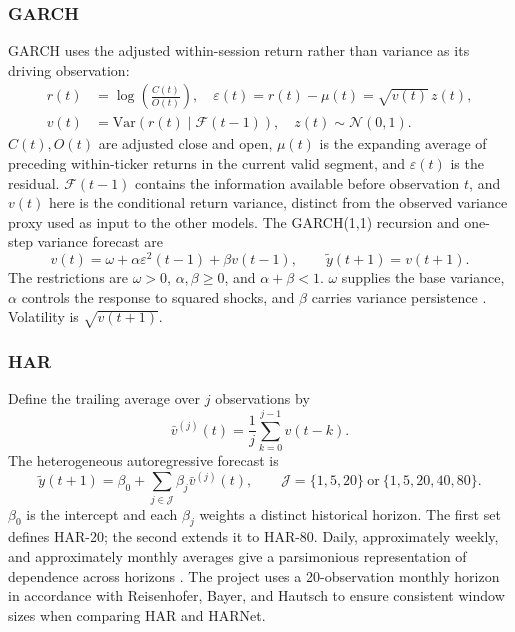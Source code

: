 \documentclass[12pt,a4paper]{article}
\numberwithin{equation}{section}
\numberwithin{table}{section}
\numberwithin{figure}{section}
\begin{document}
\subsubsection{GARCH}
GARCH uses the adjusted within-session return rather than variance as its driving observation:
\begin{equation}\label{eq:methods-garch-return}
\begin{aligned}
r(t)&=\log\!\left(\frac{C(t)}{O(t)}\right),\quad
\varepsilon(t)=r(t)-\mu(t)=\sqrt{v(t)}\,z(t),\\
v(t)&=\mathrm{Var}\!\left(r(t)\mid\mathcal F(t-1)\right),\quad z(t)\sim\mathcal N(0,1).
\end{aligned}
\end{equation}
$C(t),O(t)$ are adjusted close and open, $\mu(t)$ is the expanding average of preceding within-ticker returns in the current valid segment, and $\varepsilon(t)$ is the residual. $\mathcal F(t-1)$ contains the information available before observation $t$, and $v(t)$ here is the conditional return variance, distinct from the observed variance proxy used as input to the other models. The GARCH(1,1) recursion and one-step variance forecast are
\begin{equation}\label{eq:methods-garch}
v(t)=\omega+\alpha\varepsilon^2(t-1)+\beta v(t-1),\qquad
\widetilde y(t+1)=v(t+1).
\end{equation}
The restrictions are $\omega>0$, $\alpha,\beta\geq0$, and $\alpha+\beta<1$. $\omega$ supplies the base variance, $\alpha$ controls the response to squared shocks, and $\beta$ carries variance persistence \cite{bollerslev1986}. Volatility is $\sqrt{v(t+1)}$.

\subsubsection{HAR}
Define the trailing average over $j$ observations by
\begin{equation}\label{eq:methods-har-average}
\bar v^{(j)}(t)=\frac1j\sum_{k=0}^{j-1}v(t-k).
\end{equation}
The heterogeneous autoregressive forecast is
\begin{equation}\label{eq:methods-har}
\widetilde y(t+1)=\beta_0+\sum_{j\in\mathcal J}\beta_j\bar v^{(j)}(t),\qquad
\mathcal J=\{1,5,20\}\ \text{or}\ \{1,5,20,40,80\}.
\end{equation}
$\beta_0$ is the intercept and each $\beta_j$ weights a distinct historical horizon. The first set defines HAR-20; the second extends it to HAR-80. Daily, approximately weekly, and approximately monthly averages give a parsimonious representation of dependence across horizons \cite{corsi2009,reisenhofer2022}. The project uses a 20-observation monthly horizon in accordance with Reisenhofer, Bayer, and Hautsch \cite{reisenhofer2022} to ensure consistent window sizes when comparing HAR and HARNet.
\end{document}
